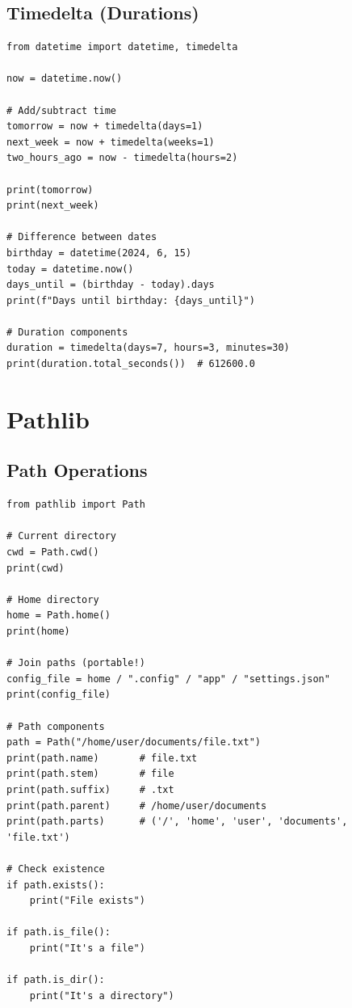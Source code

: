 \subsection{Timedelta (Durations)}

\begin{lstlisting}
from datetime import datetime, timedelta

now = datetime.now()

# Add/subtract time
tomorrow = now + timedelta(days=1)
next_week = now + timedelta(weeks=1)
two_hours_ago = now - timedelta(hours=2)

print(tomorrow)
print(next_week)

# Difference between dates
birthday = datetime(2024, 6, 15)
today = datetime.now()
days_until = (birthday - today).days
print(f"Days until birthday: {days_until}")

# Duration components
duration = timedelta(days=7, hours=3, minutes=30)
print(duration.total_seconds())  # 612600.0
\end{lstlisting}

\section{Pathlib}

\subsection{Path Operations}

\begin{lstlisting}
from pathlib import Path

# Current directory
cwd = Path.cwd()
print(cwd)

# Home directory
home = Path.home()
print(home)

# Join paths (portable!)
config_file = home / ".config" / "app" / "settings.json"
print(config_file)

# Path components
path = Path("/home/user/documents/file.txt")
print(path.name)       # file.txt
print(path.stem)       # file
print(path.suffix)     # .txt
print(path.parent)     # /home/user/documents
print(path.parts)      # ('/', 'home', 'user', 'documents', 'file.txt')

# Check existence
if path.exists():
    print("File exists")

if path.is_file():
    print("It's a file")

if path.is_dir():
    print("It's a directory")
\end{lstlisting}

